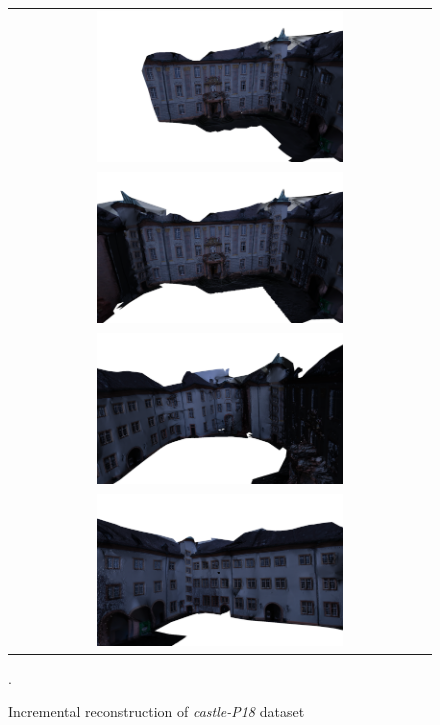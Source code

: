 \begin{figure}[t]
\centering
\setlength{\tabcolsep}{1px}
\begin{tabular}{c}
\includegraphics[width=0.6\textwidth]{./img/ch-incr-dens/castle01}\\
\includegraphics[width=0.6\textwidth]{./img/ch-incr-dens/castle02}\\
\includegraphics[width=0.6\textwidth]{./img/ch-incr-dens/castle03}\\
\includegraphics[width=0.6\textwidth]{./img/ch-incr-dens/castle04}
\end{tabular}
\caption{Incremental reconstruction of \emph{castle-P18} dataset}.
\label{fig:castle}
\end{figure}

